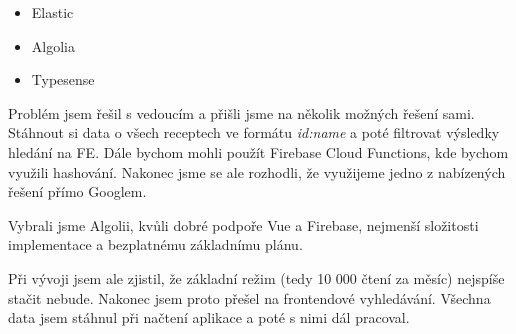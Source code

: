 \begin{itemize}
    \item Elastic
    \item Algolia
    \item Typesense
\end{itemize}

Problém jsem řešil s vedoucím a přišli jsme na několik možných řešení sami. Stáhnout si data o všech receptech ve formátu
\emph{id:name} a poté filtrovat výsledky hledání na FE. Dále bychom mohli použít Firebase Cloud Functions, kde bychom
využili hashování. Nakonec jsme se ale rozhodli, že využijeme jedno z nabízených řešení přímo Googlem.

Vybrali jsme Algolii, kvůli dobré podpoře Vue a Firebase, nejmenší složitosti implementace a bezplatnému základnímu plánu.

Při vývoji jsem ale zjistil, že základní režim (tedy 10 000 čtení za měsíc) nejspíše stačit nebude. Nakonec jsem proto přešel na
frontendové vyhledávání. Všechna data jsem stáhnul při načtení aplikace a poté s nimi dál pracoval.
